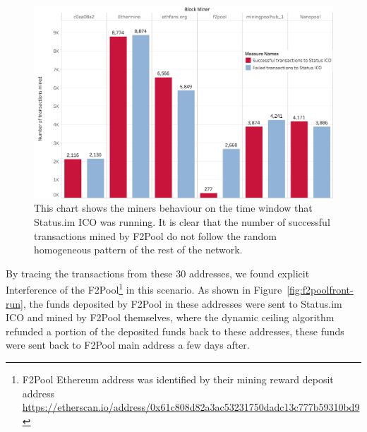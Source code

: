 \begin{figure}[h]
\centering
\includegraphics[width=0.7\linewidth]{figures/Transactions_miners_while_status_ico_cut_only_icotx.png}
\caption{This chart shows the miners behaviour on the time window that Status.im ICO was running. It is clear that the number of successful transactions mined by F2Pool do not follow the random homogeneous pattern of the rest of the network. \label{fig:Transactions_miners_while_status_ico_cut}} 
\end{figure}


By tracing the transactions from these 30 addresses, we found explicit Interference of the F2Pool\footnote{F2Pool Ethereum address was identified by their mining reward deposit address \url{https://etherscan.io/address/0x61c808d82a3ac53231750dadc13c777b59310bd9}} in this scenario. As shown in Figure~\ref{fig:f2poolfront-run}, the funds deposited by F2Pool in these addresses were sent to Status.im ICO and mined by F2Pool themselves, where the dynamic ceiling algorithm refunded a portion of the deposited funds back to these addresses, these funds were sent back to F2Pool main address a few days after. 

